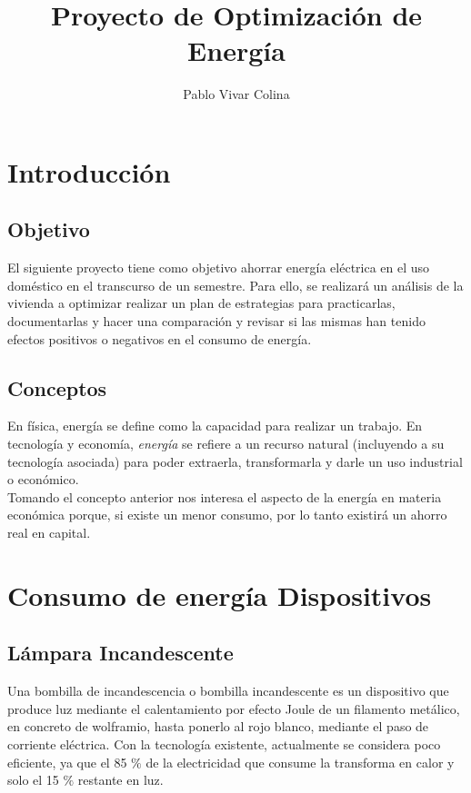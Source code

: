 \documentclass[]{article}
\title{Proyecto de Optimización de Energía}
\author{Pablo Vivar Colina}
\begin{document}
\maketitle

\tableofcontents

\section{Introducción}

\subsection{Objetivo}

El siguiente proyecto tiene como objetivo ahorrar energía eléctrica en el uso doméstico en el transcurso de un semestre. Para ello, se realizará un análisis de la vivienda a optimizar realizar un plan de estrategias para practicarlas, documentarlas y hacer una comparación y revisar si las mismas han tenido efectos positivos o negativos en el consumo de energía.\\


\subsection{Conceptos}

En física, energía se define como la capacidad para realizar un trabajo. En tecnología y economía, \textit{energía} se refiere a un recurso natural (incluyendo a su tecnología asociada) para poder extraerla, transformarla y darle un uso industrial o económico.\citep{EnergiaWiki}\\

Tomando el concepto anterior nos interesa el aspecto de la energía en materia económica porque, si existe un menor consumo, por lo tanto existirá un ahorro real en capital.\\


\section{Consumo de energía Dispositivos}

\subsection{Lámpara Incandescente}

Una bombilla de incandescencia o bombilla incandescente es un dispositivo que produce luz mediante el calentamiento por efecto Joule de un filamento metálico, en concreto de wolframio, hasta ponerlo al rojo blanco, mediante el paso de corriente eléctrica. Con la tecnología existente, actualmente se considera poco eficiente, ya que el 85 $\%$ de la electricidad que consume la transforma en calor y solo el 15 $\%$ restante en luz.\citep{LamparaIncandescente}
\end{document}
